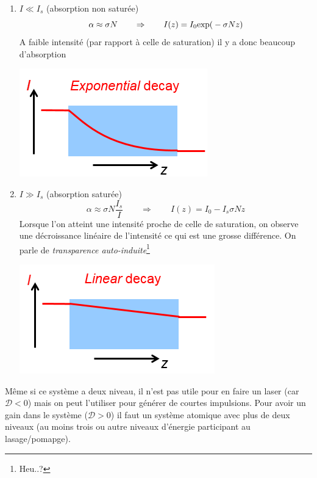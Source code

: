 \begin{enumerate}
\item $I\ll I_s$ (absorption non saturée)
\begin{equation}
\alpha\approx \sigma N \qquad \Rightarrow\qquad I(z) = {I_0}{\rm{exp(}} - \sigma Nz{\rm{)}}
\end{equation}
A faible intensité (par rapport à celle de saturation) il y a donc beaucoup d'absorption
\begin{center}
	\includegraphics[scale=0.6]{ch4/image3.png}
\end{center}


\item $I \gg I_s$ (absorption saturée)
\begin{equation}
\alpha  \approx \sigma N\frac{{{I_s}}}{I}\qquad\Rightarrow\qquad 
I(z) = {I_0} - {I_s}\sigma Nz
\end{equation}
Lorsque l'on atteint une intensité proche de celle de saturation, on observe une décroissance 
linéaire de l'intensité ce qui est une grosse différence. On parle de \textit{transparence 
auto-induite}\footnote{Heu..?}
\begin{center}
	\includegraphics[scale=0.6]{ch4/image4.png}
\end{center}
\end{enumerate}

Même si ce système a deux niveau, il n'est pas utile pour en faire un laser (car $\mathcal{D}<0$) 
mais on peut l'utiliser pour générer de courtes impulsions. Pour avoir un gain dans le système 
($\mathcal{D}>0$) il faut un système atomique avec plus de deux niveaux (au moins 
trois ou autre niveaux d'énergie participant au lasage/pomapge).

